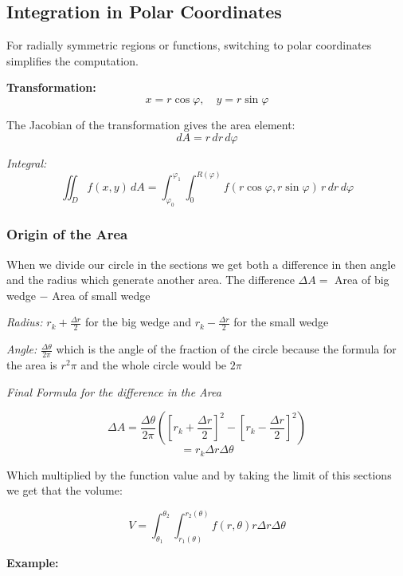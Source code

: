 \subsection{Integration in Polar Coordinates}

For radially symmetric regions or functions, switching to polar coordinates simplifies the computation.
\vspace{\baselineskip}

\textbf{Transformation:}
\[
x = r \cos \varphi, \quad y = r \sin \varphi
\]

The Jacobian of the transformation gives the area element:
\[
dA = r\, dr\, d\varphi
\]


\emph{Integral:}
\[
\iint_D f(x, y)\, dA = \int_{\varphi_0}^{\varphi_1} \int_{0}^{R(\varphi)} f(r \cos \varphi, r \sin \varphi)\, r\, dr\, d\varphi
\]

\subsubsection{Origin of the Area}
When we divide our circle in the sections we get both a difference in then angle and the radius which generate another area.
The difference \(\Delta A =\) Area of big wedge \(-\) Area of small wedge
\vspace{\baselineskip}

\emph{Radius: }\(r_k + \frac{\Delta r}{2}\) for the big wedge and \(r_k - \frac{\Delta r}{2}\) for the small wedge
\vspace{\baselineskip}

\emph{Angle: }\(\frac{\Delta \theta}{2 \pi}\) which is the angle of the fraction of the circle because the formula for the area is \(r^2 \pi\)
and the whole circle would be \(2\pi\)
\vspace{\baselineskip}

\emph{Final Formula for the difference in the Area}

\[\Delta A = \frac{\Delta \theta}{2 \pi} \left ( {\left[r_k + \frac{\Delta r}{2}\right]}^2 - {\left[r_k - \frac{\Delta r}{2}\right]}^2\right)\] 
\[ = r_k \Delta r \Delta \theta\]

Which multiplied by the function value and by taking the limit of this sections we get that the volume:

\[
V = \int_{\theta_1}^{\theta_2} \int_{r_1 (\theta)}^{r_2 (\theta)} f(r, \theta) r \Delta r \Delta \theta
\]

\textbf{Example:}
\vspace{\baselineskip}

